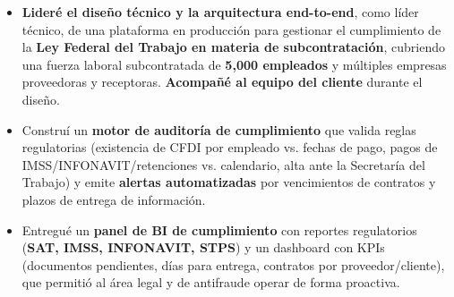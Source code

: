 {
\begin{itemize}
    \item \textbf{Lideré el diseño técnico y la arquitectura end-to-end}, como líder técnico, de una plataforma en producción para gestionar el cumplimiento de la \textbf{Ley Federal del Trabajo en materia de subcontratación}, cubriendo una fuerza laboral subcontratada de \textbf{5,000 empleados} y múltiples empresas proveedoras y receptoras. \textbf{Acompañé al equipo del cliente} durante el diseño.
    \item Construí un \textbf{motor de auditoría de cumplimiento} que valida reglas regulatorias (existencia de CFDI por empleado vs. fechas de pago, pagos de IMSS/INFONAVIT/retenciones vs. calendario, alta ante la Secretaría del Trabajo) y emite \textbf{alertas automatizadas} por vencimientos de contratos y plazos de entrega de información.
    \item Entregué un \textbf{panel de BI de cumplimiento} con reportes regulatorios (\textbf{SAT, IMSS, INFONAVIT, STPS}) y un dashboard con KPIs (documentos pendientes, días para entrega, contratos por proveedor/cliente), que permitió al área legal y de antifraude operar de forma proactiva.
\end{itemize}
}

